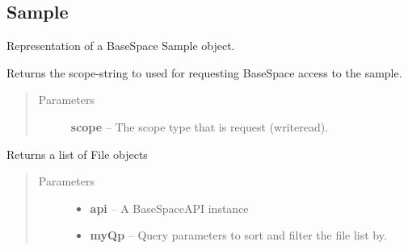 \documentclass[letterpaper,10pt,english]{sphinxmanual}
\begin{document}
\subsection{Sample}
\label{Available modules:sample}

\begin{fulllineitems}
\label{Available modules:BaseSpacePy.model.Sample.Sample}
Representation of a BaseSpace Sample object.

\begin{fulllineitems}
\label{Available modules:BaseSpacePy.model.Sample.Sample.getAccessStr}
Returns the scope-string to used for requesting BaseSpace access to the sample.
\begin{quote}\begin{description}
\item[{Parameters}] \leavevmode
\textbf{scope} -- The scope type that is request (write\textbar{}read).

\end{description}\end{quote}

\end{fulllineitems}


\begin{fulllineitems}
\label{Available modules:BaseSpacePy.model.Sample.Sample.getFiles}
Returns a list of File objects
\begin{quote}\begin{description}
\item[{Parameters}] \leavevmode\begin{itemize}
\item {} 
\textbf{api} -- A BaseSpaceAPI instance

\item {} 
\textbf{myQp} -- Query parameters to sort and filter the file list by.

\end{itemize}

\end{description}\end{quote}


\end{fulllineitems}
\end{fulllineitems}
\end{document}
